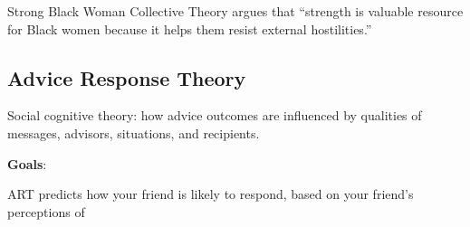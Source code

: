 \documentclass[
]{book}
\begin{document}
Strong Black Woman Collective Theory argues that ``strength is valuable resource for Black women because it helps them
resist external hostilities.'' \citep{Davis_2014}

\hypertarget{advice-response-theory}{%
\subsection{Advice Response Theory}\label{advice-response-theory}}

Social cognitive theory: how advice outcomes are influenced by qualities of messages, advisors, situations, and
recipients.

\textbf{Goals}:

ART predicts how your friend is likely to respond, based on your friend's perceptions of
\end{document}
